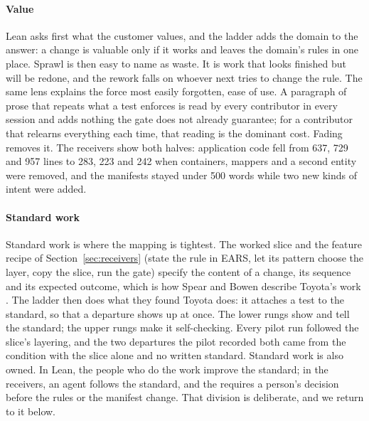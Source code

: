 \paragraph{Value} Lean asks first what the customer values, and the ladder adds the domain to the
answer: a change is valuable only if it works and leaves the domain's rules in one place. Sprawl is
then easy to name as waste. It is work that looks finished but will be redone, and the rework
falls on whoever next tries to change the rule. The same lens explains the force most easily
forgotten, ease of use. A paragraph of prose that repeats what a test enforces is read by every
contributor in every session and adds nothing the gate does not already guarantee; for a
contributor that relearns everything each time, that reading is the dominant cost. Fading removes
it. The receivers show both halves: application code fell from 637, 729 and 957 lines to 283, 223
and 242 when containers, mappers and a second entity were removed, and the manifests stayed under
500 words while two new kinds of intent were added.

\paragraph{Standard work} Standard work is where the mapping is tightest. The worked slice and the
feature recipe of Section~\ref{sec:receivers} (state the rule in EARS, let its pattern choose the
layer, copy the slice, run the gate) specify the content of a change, its sequence and its
expected outcome, which is how Spear and Bowen describe Toyota's work \citep{spear1999decoding}.
The ladder then does what they found Toyota does: it attaches a test to the standard, so that a
departure shows up at once. The lower rungs show and tell the standard; the upper rungs make it
self-checking. Every pilot run followed the slice's layering, and the two departures the pilot
recorded both came from the condition with the slice alone and no written standard. Standard work
is also owned. In Lean, the people who do the work improve the standard; in the receivers, an agent
follows the standard, and the  requires a person's decision before the
rules or the manifest change. That division is deliberate, and we return to it below.

